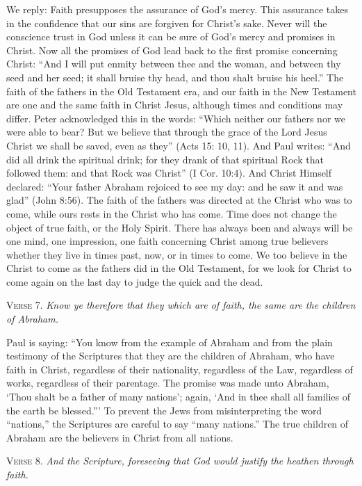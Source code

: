 We reply: Faith presupposes the assurance of God’s mercy. This assurance takes in the confidence that our sins are forgiven for Christ’s sake. Never will the conscience trust in God unless it can be sure of God’s mercy and promises in Christ. Now all the promises of God lead back to the first promise concerning Christ: “And I will put enmity between thee and the woman, and between thy seed and her seed; it shall bruise thy head, and thou shalt bruise his heel.” The faith of the fathers in the Old Testament era, and our faith in the New Testament are one and the same faith in Christ Jesus, although times and conditions may differ. Peter acknowledged this in the words: “Which neither our fathers nor we were able to bear? But we believe that through the grace of the Lord Jesus Christ we shall be saved, even as they” (Acts 15: 10, 11). And Paul writes: “And did all drink the spiritual drink; for they drank of that spiritual Rock that followed them: and that Rock was Christ” (I Cor. 10:4). And Christ Himself declared: “Your father Abraham rejoiced to see my day: and he saw it and was glad” (John 8:56). The faith of the fathers was directed at the Christ who was to come, while ours rests in the Christ who has come. Time does not change the object of true faith, or the Holy Spirit. There has always been and always will be one mind, one impression, one faith concerning Christ among true believers whether they live in times past, now, or in times to come. We too believe in the Christ to come as the fathers did in the Old Testament, for we look for Christ to come again on the last day to judge the quick and the dead.

\textsc{Verse} 7. \emph{Know ye therefore that they which are of faith, the same are the children of Abraham.}

Paul is saying: “You know from the example of Abraham and from the plain testimony of the Scriptures that they are the children of Abraham, who have faith in Christ, regardless of their nationality, regardless of the Law, regardless of works, regardless of their parentage. The promise was made unto Abraham, ‘Thou shalt be a father of many nations’; again, ‘And in thee shall all families of the earth be blessed.”’ To prevent the Jews from misinterpreting the word “nations,” the Scriptures are careful to say “many nations.” The true children of Abraham are the believers in Christ from all nations.

\textsc{Verse} 8. \emph{And the Scripture, foreseeing that God would justify the heathen through faith.}

